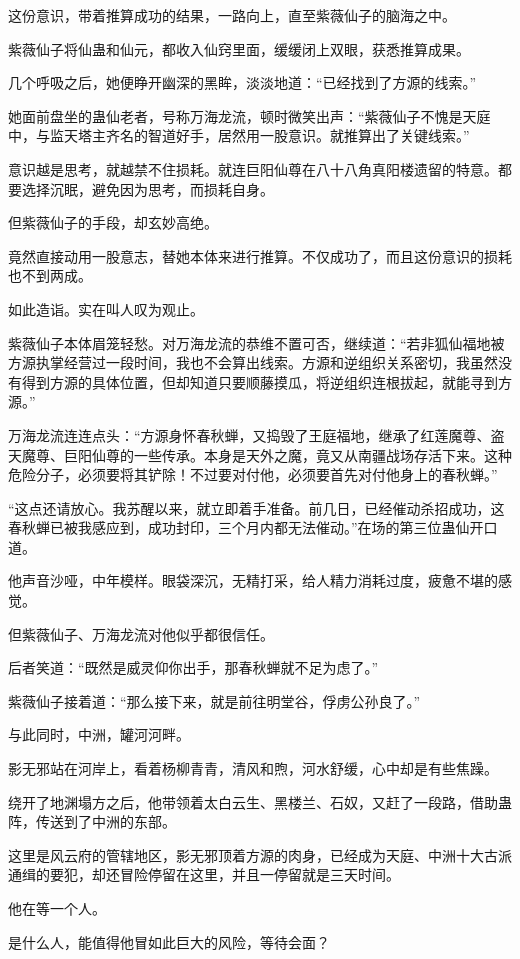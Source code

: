 \begin{this_body}
这份意识，带着推算成功的结果，一路向上，直至紫薇仙子的脑海之中。

紫薇仙子将仙蛊和仙元，都收入仙窍里面，缓缓闭上双眼，获悉推算成果。

几个呼吸之后，她便睁开幽深的黑眸，淡淡地道：“已经找到了方源的线索。”

她面前盘坐的蛊仙老者，号称万海龙流，顿时微笑出声：“紫薇仙子不愧是天庭中，与监天塔主齐名的智道好手，居然用一股意识。就推算出了关键线索。”

意识越是思考，就越禁不住损耗。就连巨阳仙尊在八十八角真阳楼遗留的特意。都要选择沉眠，避免因为思考，而损耗自身。

但紫薇仙子的手段，却玄妙高绝。

竟然直接动用一股意志，替她本体来进行推算。不仅成功了，而且这份意识的损耗也不到两成。

如此造诣。实在叫人叹为观止。

紫薇仙子本体眉笼轻愁。对万海龙流的恭维不置可否，继续道：“若非狐仙福地被方源执掌经营过一段时间，我也不会算出线索。方源和逆组织关系密切，我虽然没有得到方源的具体位置，但却知道只要顺藤摸瓜，将逆组织连根拔起，就能寻到方源。”

万海龙流连连点头：“方源身怀春秋蝉，又捣毁了王庭福地，继承了红莲魔尊、盗天魔尊、巨阳仙尊的一些传承。本身是天外之魔，竟又从南疆战场存活下来。这种危险分子，必须要将其铲除！不过要对付他，必须要首先对付他身上的春秋蝉。”

“这点还请放心。我苏醒以来，就立即着手准备。前几日，已经催动杀招成功，这春秋蝉已被我感应到，成功封印，三个月内都无法催动。”在场的第三位蛊仙开口道。

他声音沙哑，中年模样。眼袋深沉，无精打采，给人精力消耗过度，疲惫不堪的感觉。

但紫薇仙子、万海龙流对他似乎都很信任。

后者笑道：“既然是威灵仰你出手，那春秋蝉就不足为虑了。”

紫薇仙子接着道：“那么接下来，就是前往明堂谷，俘虏公孙良了。”

与此同时，中洲，罐河河畔。

影无邪站在河岸上，看着杨柳青青，清风和煦，河水舒缓，心中却是有些焦躁。

绕开了地渊塌方之后，他带领着太白云生、黑楼兰、石奴，又赶了一段路，借助蛊阵，传送到了中洲的东部。

这里是风云府的管辖地区，影无邪顶着方源的肉身，已经成为天庭、中洲十大古派通缉的要犯，却还冒险停留在这里，并且一停留就是三天时间。

他在等一个人。

是什么人，能值得他冒如此巨大的风险，等待会面？


\end{this_body}
